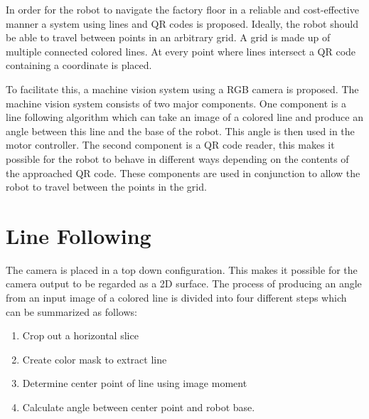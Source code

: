 In order for the robot to navigate the factory floor in a reliable and cost-effective manner a system using lines and QR codes is proposed.
Ideally, the robot should be able to travel between points in an arbitrary grid.
A grid is made up of multiple connected colored lines.
At every point where lines intersect a QR code containing a coordinate is placed.

To facilitate this, a machine vision system using a RGB camera is proposed. The machine vision system consists of two major components.
One component is a line following algorithm which can take an image of a colored line and produce an angle between this line and the base of the robot. This angle is then used in the motor controller.
The second component is a QR code reader, this makes it possible for the robot to behave in different ways depending on the contents of the approached QR code.
These components are used in conjunction to allow the robot to travel between the points in the grid.

\section*{Line Following}
The camera is placed in a top down configuration. This makes it possible for the camera output to be regarded as a 2D surface.
The process of producing an angle from an input image of a colored line is divided into four different steps which can be summarized as follows:

\begin{enumerate}
	\item Crop out a horizontal slice
	\item Create color mask to extract line
	\item Determine center point of line using image moment
	\item Calculate angle between center point and robot base.
\end{enumerate}

